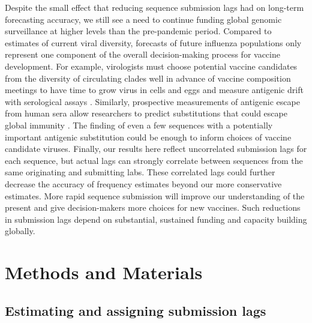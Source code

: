 \documentclass[9pt,lineno]{elife}
\begin{document}
Despite the small effect that reducing sequence submission lags had on long-term forecasting accuracy, we still see a need to continue funding global genomic surveillance at higher levels than the pre-pandemic period.
Compared to estimates of current viral diversity, forecasts of future influenza populations only represent one component of the overall decision-making process for vaccine development.
For example, virologists must choose potential vaccine candidates from the diversity of circulating clades well in advance of vaccine composition meetings to have time to grow virus in cells and eggs and measure antigenic drift with serological assays \citep{Morris2018,Loes2024}.
Similarly, prospective measurements of antigenic escape from human sera allow researchers to predict substitutions that could escape global immunity \citep{Lee2019,Greaney2022,Welsh2023}.
The finding of even a few sequences with a potentially important antigenic substitution could be enough to inform choices of vaccine candidate viruses.
Finally, our results here reflect uncorrelated submission lags for each sequence, but actual lags can strongly correlate between sequences from the same originating and submitting labs.
These correlated lags could further decrease the accuracy of frequency estimates beyond our more conservative estimates.
More rapid sequence submission will improve our understanding of the present and give decision-makers more choices for new vaccines.
Such reductions in submission lags depend on substantial, sustained funding and capacity building globally.


\section{Methods and Materials}

\subsection{Estimating and assigning submission lags}
\end{document}
